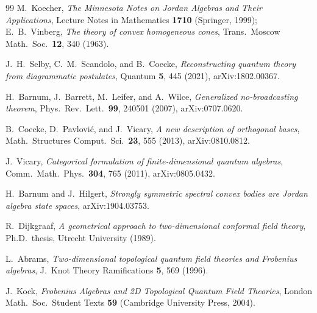 \documentclass[prl,aps,10pt,superscriptaddress,floatfix]{revtex4-2}
\begin{document}
\begin{thebibliography}{99}
M.~Koecher, \emph{The Minnesota Notes on Jordan Algebras and Their Applications},
Lecture Notes in Mathematics \textbf{1710} (Springer, 1999);
E.~B.~Vinberg, \emph{The theory of convex homogeneous cones},
Trans.\ Moscow Math.\ Soc.\ \textbf{12}, 340 (1963).

J.~H.~Selby, C.~M.~Scandolo, and B.~Coecke,
\emph{Reconstructing quantum theory from diagrammatic postulates},
Quantum \textbf{5}, 445 (2021),
arXiv:1802.00367.

H.~Barnum, J.~Barrett, M.~Leifer, and A.~Wilce,
\emph{Generalized no-broadcasting theorem},
Phys.\ Rev.\ Lett.\ \textbf{99}, 240501 (2007),
arXiv:0707.0620.

B.~Coecke, D.~Pavlovi\'c, and J.~Vicary,
\emph{A new description of orthogonal bases},
Math.\ Structures Comput.\ Sci.\ \textbf{23}, 555 (2013),
arXiv:0810.0812.

J.~Vicary,
\emph{Categorical formulation of finite-dimensional quantum algebras},
Comm.\ Math.\ Phys.\ \textbf{304}, 765 (2011),
arXiv:0805.0432.

H.~Barnum and J.~Hilgert,
\emph{Strongly symmetric spectral convex bodies are Jordan algebra state spaces},
arXiv:1904.03753.

R.~Dijkgraaf,
\emph{A geometrical approach to two-dimensional conformal field theory},
Ph.D.\ thesis, Utrecht University (1989).

L.~Abrams,
\emph{Two-dimensional topological quantum field theories and Frobenius algebras},
J.\ Knot Theory Ramifications \textbf{5}, 569 (1996).

J.~Kock,
\emph{Frobenius Algebras and 2D Topological Quantum Field Theories},
London Math.\ Soc.\ Student Texts \textbf{59}
(Cambridge University Press, 2004).

\end{thebibliography}
\end{document}
